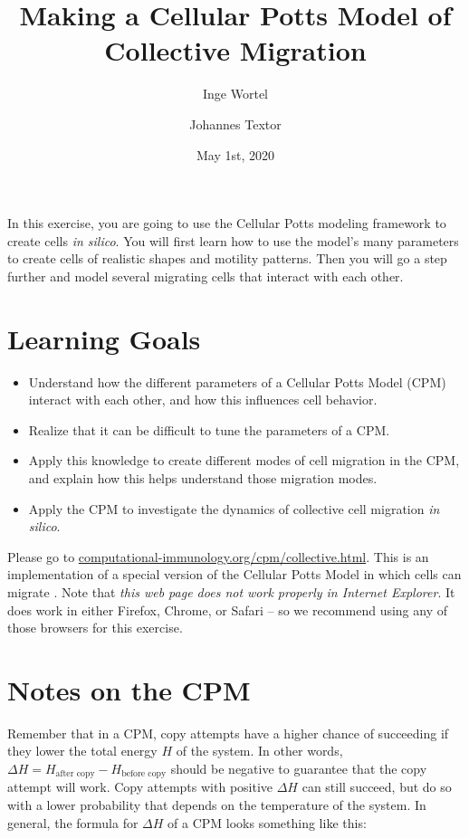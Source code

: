\documentclass{article}
\title{Making a Cellular Potts Model of Collective Migration}
\author{Inge Wortel \and Johannes Textor}
\date{May 1st, 2020}
\begin{document}
\maketitle

In this exercise, you are going to use the Cellular Potts modeling framework to create cells \emph{in silico}. You will first learn how to use the model's many parameters to create cells of realistic shapes and motility patterns. Then you will go a step further and model several migrating cells that interact with each other.

\section*{Learning Goals}
\begin{itemize}
\item Understand how the different parameters of a Cellular Potts Model (CPM) interact with each other, and how this influences cell behavior. 
\item Realize that it can be difficult to tune the parameters of a CPM.
\item Apply this knowledge to create different modes of cell migration in the CPM, and explain how this helps understand those migration modes.
\item Apply the CPM to investigate the dynamics of collective cell migration \emph{in silico}.
\end{itemize}

Please go to {\color{blue}\href{http://computational-immunology.org/cpm/collective.html}{computational-immunology.org/cpm/collective.html}}. This is an implementation of a special version of the Cellular Potts Model in which cells can migrate \cite{niculescu_crawling_2015}.
Note that \emph{this web page does not work properly in Internet Explorer}. It does work in either Firefox, Chrome, or Safari -- so we recommend using any of those browsers for this exercise.

\section*{Notes on the CPM} 


Remember that in a CPM, copy attempts have a higher chance of succeeding if they lower the total energy $H$ of the system. In other words, $\Delta H = H_\text{after copy} - H_\text{before copy}$ should be negative to guarantee that the copy attempt will work. Copy attempts with positive $\Delta H$ can still succeed, but do so with a lower probability that depends on the temperature of the system. In general, the formula for $\Delta H$ of a CPM looks something like this:
\end{document}
